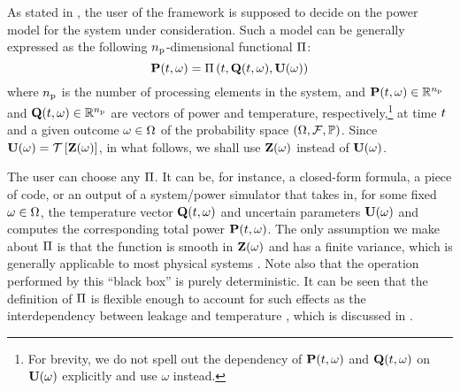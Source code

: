 As stated in , the user of the framework is supposed to decide on the power model for the system under consideration.
Such a model can be generally expressed as the following ${n_\text{p}}$-dimensional functional $\oPower$:
\begin{equation} \elabel{power-model}
  \vP(\t, \o) = \oPower{\t, \vTO(\t, \o), \vU(\o)}
\end{equation}
where ${n_\text{p}}$ is the number of processing elements in the system, and $\mathbf{P}(t, \omega) \in \mathbb{R}^{n_\text{p}}$ and $\mathbf{Q}(t, \omega) \in \mathbb{R}^{n_\text{p}}$ are vectors of power and temperature, respectively,\footnote{For brevity, we do not spell out the dependency of $\mathbf{P}(t, \omega)$ and $\mathbf{Q}(t, \omega)$ on $\mathbf{U}(\omega)$ explicitly and use $\omega$ instead.} at time $t$ and a given outcome $\omega \in \Omega$ of the probability space $(\Omega, \mathcal{F}, \mathbb{P})$.
Since $\vU(\o) = \oTransform{\vZ(\o)}$, in what follows, we shall use $\mathbf{Z}(\omega)$ instead of $\mathbf{U}(\omega)$.

The user can choose any $\oPower$. It can be, for instance, a closed-form formula, a piece of code, or an output of a system/power simulator that takes in, for some fixed $\omega \in \Omega$, the temperature vector $\mathbf{Q}(t, \omega)$ and uncertain parameters $\mathbf{U}(\omega)$ and computes the corresponding total power $\mathbf{P}(t, \omega)$.
The only assumption we make about $\oPower$ is that the function is smooth in $\mathbf{Z}(\omega)$ and has a finite variance, which is generally applicable to most physical systems \cite{xiu2010}.
Note also that the operation performed by this ``black box'' is purely deterministic.
It can be seen that the definition of $\oPower$ is flexible enough to account for such effects as the interdependency between leakage and temperature \cite{srivastava2010, liu2007}, which is discussed in .
